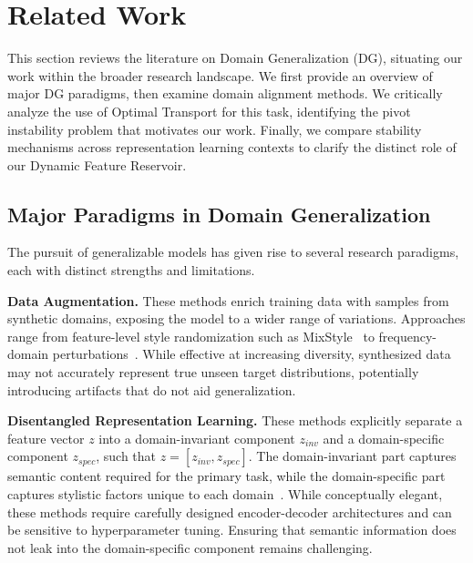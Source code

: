 \section{Related Work}
\label{sec:related_work}

This section reviews the literature on Domain Generalization (DG), situating our work within the broader research landscape. We first provide an overview of major DG paradigms, then examine domain alignment methods. We critically analyze the use of Optimal Transport for this task, identifying the pivot instability problem that motivates our work. Finally, we compare stability mechanisms across representation learning contexts to clarify the distinct role of our Dynamic Feature Reservoir.

\subsection{Major Paradigms in Domain Generalization}

The pursuit of generalizable models has given rise to several research paradigms, each with distinct strengths and limitations.

\textbf{Data Augmentation.} These methods enrich training data with samples from synthetic domains, exposing the model to a wider range of variations. Approaches range from feature-level style randomization such as MixStyle~\citep{zhou2021mixstyle} to frequency-domain perturbations~\citep{xu2021fourier}. While effective at increasing diversity, synthesized data may not accurately represent true unseen target distributions, potentially introducing artifacts that do not aid generalization.

\textbf{Disentangled Representation Learning.} These methods explicitly separate a feature vector $z$ into a domain-invariant component $z_{inv}$ and a domain-specific component $z_{spec}$, such that $z = [z_{inv}, z_{spec}]$. The domain-invariant part captures semantic content required for the primary task, while the domain-specific part captures stylistic factors unique to each domain~\citep{bui2021exploiting, peng2019domain, ilse2020diva}. While conceptually elegant, these methods require carefully designed encoder-decoder architectures and can be sensitive to hyperparameter tuning. Ensuring that semantic information does not leak into the domain-specific component remains challenging.

